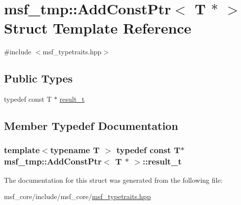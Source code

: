 \hypertarget{structmsf__tmp_1_1AddConstPtr_3_01T_01_5_01_4}{\section{msf\-\_\-tmp\-:\-:Add\-Const\-Ptr$<$ T $\ast$ $>$ Struct Template Reference}
\label{structmsf__tmp_1_1AddConstPtr_3_01T_01_5_01_4}
}


{\ttfamily \#include $<$msf\-\_\-typetraits.\-hpp$>$}

\subsection*{Public Types}
\begin{DoxyCompactItemize}
\item 
typedef const T $\ast$ \hyperlink{structmsf__tmp_1_1AddConstPtr_3_01T_01_5_01_4_a37edeecdf949a9568898ba136d433f53}{result\-\_\-t}
\end{DoxyCompactItemize}


\subsection{Member Typedef Documentation}
\hypertarget{structmsf__tmp_1_1AddConstPtr_3_01T_01_5_01_4_a37edeecdf949a9568898ba136d433f53}{
\subsubsection[{result\-\_\-t}]{\setlength{\rightskip}{0pt plus 5cm}template$<$typename T $>$ typedef const T$\ast$ {\bf msf\-\_\-tmp\-::\-Add\-Const\-Ptr}$<$ T $\ast$ $>$\-::{\bf result\-\_\-t}}}\label{structmsf__tmp_1_1AddConstPtr_3_01T_01_5_01_4_a37edeecdf949a9568898ba136d433f53}


The documentation for this struct was generated from the following file\-:\begin{DoxyCompactItemize}
\item 
msf\-\_\-core/include/msf\-\_\-core/\hyperlink{msf__typetraits_8hpp}{msf\-\_\-typetraits.\-hpp}\end{DoxyCompactItemize}
